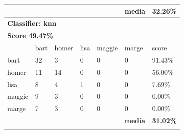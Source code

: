 \documentclass[journal]{IEEEtran}
\begin{document}
\begin{table}[!htb]
\begin{tabular}{l|l|l|l|l|l|l}
          &           &           &           &           & \textbf{media} & \textbf{32.26\%} \\ \hline
\multicolumn{7}{l}{\textbf{Classifier: knn}}                                                \\ \hline
\multicolumn{7}{l}{\textbf{Score 49.47\%}}                                                  \\ \hline
          & bart      & homer     & lisa      & maggie    & marge          & score            \\ \hline
bart      & 32        & 3         & 0         & 0         & 0              & 91.43\%          \\ \hline
homer     & 11        & 14        & 0         & 0         & 0              & 56.00\%          \\ \hline
lisa      & 8         & 4         & 1         & 0         & 0              & 7.69\%           \\ \hline
maggie    & 9         & 3         & 0         & 0         & 0              & 0.00\%           \\ \hline
marge     & 7         & 3         & 0         & 0         & 0              & 0.00\%           \\ \hline
          &           &           &           &           & \textbf{media} & \textbf{31.02\%} \\ \hline
\multicolumn{7}{l}{\multirow{2}{*}{}}                                                       \\
\end{tabular}
\end{table}
\end{document}
